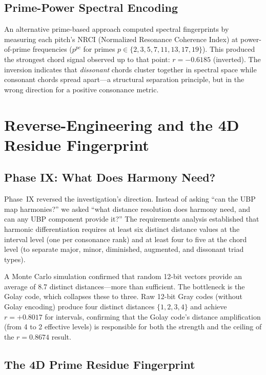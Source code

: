 \documentclass[11pt,a4paper]{article}
\theoremstyle{definition}
\begin{document}
\subsection{Prime-Power Spectral Encoding}

An alternative prime-based approach computed spectral fingerprints by measuring each pitch's NRCI (Normalized Resonance Coherence Index) at power-of-prime frequencies ($p^{pc}$ for primes $p \in \{2, 3, 5, 7, 11, 13, 17, 19\}$). This produced the strongest chord signal observed up to that point: $r = -0.6185$ (inverted). The inversion indicates that \emph{dissonant} chords cluster together in spectral space while consonant chords spread apart---a structural separation principle, but in the wrong direction for a positive consonance metric.

\section{Reverse-Engineering and the 4D Residue Fingerprint}\label{sec:phase9}

\subsection{Phase IX: What Does Harmony Need?}

Phase~IX reversed the investigation's direction. Instead of asking ``can the UBP map harmonies?'' we asked ``what distance resolution does harmony need, and can any UBP component provide it?'' The requirements analysis established that harmonic differentiation requires at least six distinct distance values at the interval level (one per consonance rank) and at least four to five at the chord level (to separate major, minor, diminished, augmented, and dissonant triad types).

A Monte Carlo simulation confirmed that random 12-bit vectors provide an average of 8.7 distinct distances---more than sufficient. The bottleneck is the Golay code, which collapses these to three. Raw 12-bit Gray codes (without Golay encoding) produce four distinct distances $\{1, 2, 3, 4\}$ and achieve $r = +0.8017$ for intervals, confirming that the Golay code's distance amplification (from 4 to 2 effective levels) is responsible for both the strength and the ceiling of the $r = 0.8674$ result.

\subsection{The 4D Prime Residue Fingerprint}
\end{document}
